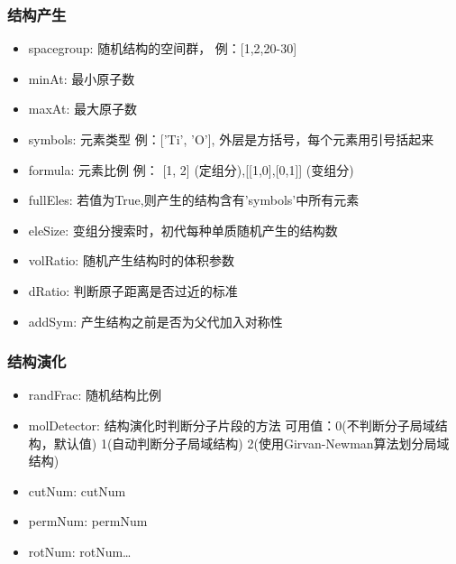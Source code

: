 \documentclass[12pt]{article}
\begin{document}
\subsubsection{结构产生}
\begin{itemize}
    \item spacegroup: 随机结构的空间群，
    例：[1,2,20-30]
    \item minAt: 最小原子数
    \item maxAt: 最大原子数
    \item symbols: 元素类型
    例：['Ti', 'O'], 外层是方括号，每个元素用引号括起来
    \item formula: 元素比例
    例： [1, 2] (定组分),[[1,0],[0,1]] (变组分)
    \item fullEles: 若值为True,则产生的结构含有'symbols'中所有元素
    \item eleSize: 变组分搜索时，初代每种单质随机产生的结构数
    \item volRatio: 随机产生结构时的体积参数
    \item dRatio: 判断原子距离是否过近的标准
    \item addSym: 产生结构之前是否为父代加入对称性
\end{itemize}

\subsubsection{结构演化}
\begin{itemize}
    \item randFrac: 随机结构比例
    \item molDetector: 结构演化时判断分子片段的方法
    可用值：0(不判断分子局域结构，默认值)  1(自动判断分子局域结构)  2(使用Girvan-Newman算法划分局域结构)
    \item cutNum: cutNum
    \item permNum: permNum
    \item rotNum: rotNum\dots
\end{itemize} 
\end{document}
